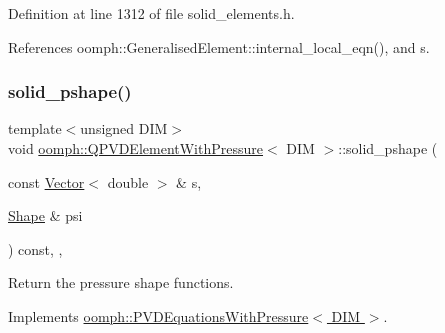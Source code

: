Definition at line 1312 of file solid\+\_\+elements.\+h.



References oomph\+::\+Generalised\+Element\+::internal\+\_\+local\+\_\+eqn(), and s.

\mbox{\label{classoomph_1_1QPVDElementWithPressure_a2775e60c755528c5d8eaf403450f93e2}} 
\subsubsection{\texorpdfstring{solid\+\_\+pshape()}{solid\_pshape()}\hspace{0.1cm}{\footnotesize\ttfamily [1/3]}}
{\footnotesize\ttfamily template$<$unsigned D\+IM$>$ \\
void \hyperlink{classoomph_1_1QPVDElementWithPressure}{oomph\+::\+Q\+P\+V\+D\+Element\+With\+Pressure}$<$ D\+IM $>$\+::solid\+\_\+pshape (\begin{DoxyParamCaption}\item[{const \hyperlink{classoomph_1_1Vector}{Vector}$<$ double $>$ \&}]{s,  }\item[{\hyperlink{classoomph_1_1Shape}{Shape} \&}]{psi }\end{DoxyParamCaption}) const\hspace{0.3cm}{\ttfamily [inline]}, {\ttfamily [protected]}, {\ttfamily [virtual]}}



Return the pressure shape functions. 



Implements \hyperlink{classoomph_1_1PVDEquationsWithPressure_ad580f7919412f6b574b76f514f56282c}{oomph\+::\+P\+V\+D\+Equations\+With\+Pressure$<$ D\+I\+M $>$}.

\mbox{\label{classoomph_1_1QPVDElementWithPressure_a2138effcaa478d8beebda1f2831fd417}} 
